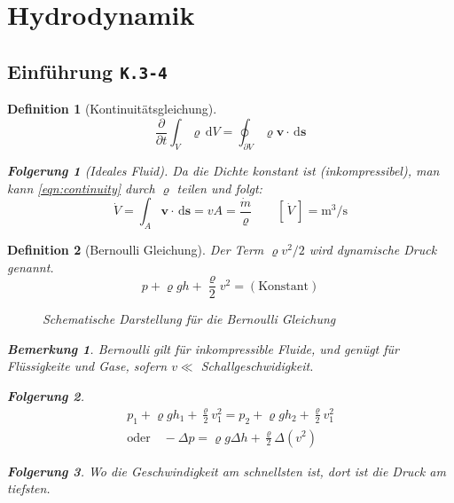 \documentclass[a4paper, twocolumn]{article}
\numberwithin{equation}{section}
\theoremstyle{hsr-def}
\newtheorem{definition}{Definition}[section]
\theoremstyle{hsr-sub}
\newtheorem{result}{Folgerung}[definition]
\newtheorem{remark}{Bemerkung}[definition]
\newcommand{\dd}[1]{\ensuremath{\mathrm{d}#1}}
\newcommand{\di}[1]{\,\dd{#1}}
\newcommand{\pderiv}[2]{\ensuremath{\frac{\partial #1}{\partial #2}}}
\renewcommand{\vec}[1]{\ensuremath{\mathbf{#1}}}
\newcommand{\unitof}[1]{\ensuremath{\left[\,#1\,\right]}}
\newcommand{\fromlecture}[1]{\textcolor{red!70!black}{\small\texttt{K.#1}}}
\begin{document}
\section{Hydrodynamik}
\subsection{Einf\"uhrung \fromlecture{3-4}}
\begin{definition}[Kontinuit\"atsgleichung]
\begin{equation} \label{eqn:continuity}
    \pderiv{}{t}\int_V \varrho \di{V} 
    = \oint_{\partial V} \varrho \vec{v}\cdot\di{\vec{s}}
\end{equation}

\begin{result}[Ideales Fluid]
Da die Dichte konstant ist (inkompressibel), man kann \eqref{eqn:continuity} durch \(\varrho\) teilen und folgt:
\[
    \dot{V} = \int_A \vec{v}\cdot\di{\vec{s}} 
    = vA = \frac{\dot{m}}{\varrho}
    \qquad
    \unitof{\dot{V}} = \si{\cubic\metre\per\second}
\]
\end{result}

\end{definition}

\begin{definition}[Bernoulli Gleichung]
Der Term \(\varrho v^2 / 2\) wird \emph{dynamische Druck} genannt.
\[
    p + \varrho g h + \frac{\varrho}{2} v^2 = (\text{Konstant})
\]

\begin{figure}[h] \centering
    \resizebox{.9\linewidth}{!}{%
    }
    \caption{Schematische Darstellung f\"ur die Bernoulli Gleichung}
\end{figure}

\begin{remark}
Bernoulli gilt f\"ur inkompressible Fluide, und gen\"ugt f\"ur Fl\"ussigkeite und Gase, sofern \(v \ll \) Schallgeschwidigkeit.
\end{remark}

\begin{result}
\begin{gather*}
    p_1 + \varrho g h_1 + \frac{\varrho}{2} v_1^2
    =
    p_2 + \varrho g h_2 + \frac{\varrho}{2} v_1^2
    \\
    \text{oder}\quad -\Delta p = \varrho g \Delta h + \frac{\varrho}{2} \Delta \left( v^2 \right)
\end{gather*}
\end{result}

\begin{result}
Wo die Geschwindigkeit am schnellsten ist, dort ist die Druck am tiefsten.
\end{result}

\end{definition}
\end{document}
